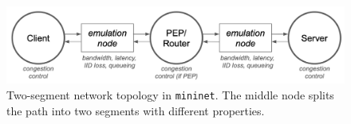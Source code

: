 \begin{figure}
    \centering
    \includegraphics[width=\linewidth]{figures/mininet-topology.png}
    \caption{\small Two-segment network topology in \texttt{mininet}. The
     middle node splits the path into two segments with different properties.}
    \label{fig:mininet}
\end{figure}
